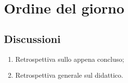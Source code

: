 \section{Ordine del giorno} \label{sec:agenda}
\subsection{Discussioni} \label{subsec:discussione}
\begin{enumerate}
    \item Retrospettiva sullo  appena concluso;
    \item Retrospettiva generale sul  didattico.
\end{enumerate}